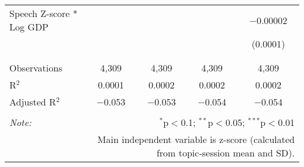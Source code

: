 \begin{table}[!htbp]
\begin{tabular}{@{\extracolsep{5pt}}lcccc}
 Speech Z-score * Log GDP &  &  &  & $-$0.00002 \\ 
  &  &  &  & (0.0001) \\ 
  & & & & \\ 
\hline \\[-1.8ex] 
Observations & 4,309 & 4,309 & 4,309 & 4,309 \\ 
R$^{2}$ & 0.0001 & 0.0002 & 0.0002 & 0.0002 \\ 
Adjusted R$^{2}$ & $-$0.053 & $-$0.053 & $-$0.054 & $-$0.054 \\ 
\hline 
\hline \\[-1.8ex] 
\textit{Note:}  & \multicolumn{4}{r}{$^{*}$p$<$0.1; $^{**}$p$<$0.05; $^{***}$p$<$0.01} \\ 
 & \multicolumn{4}{r}{Main independent variable is z-score (calculated from topic-session mean and SD).} \\ 
\end{tabular} 
\end{table} 
